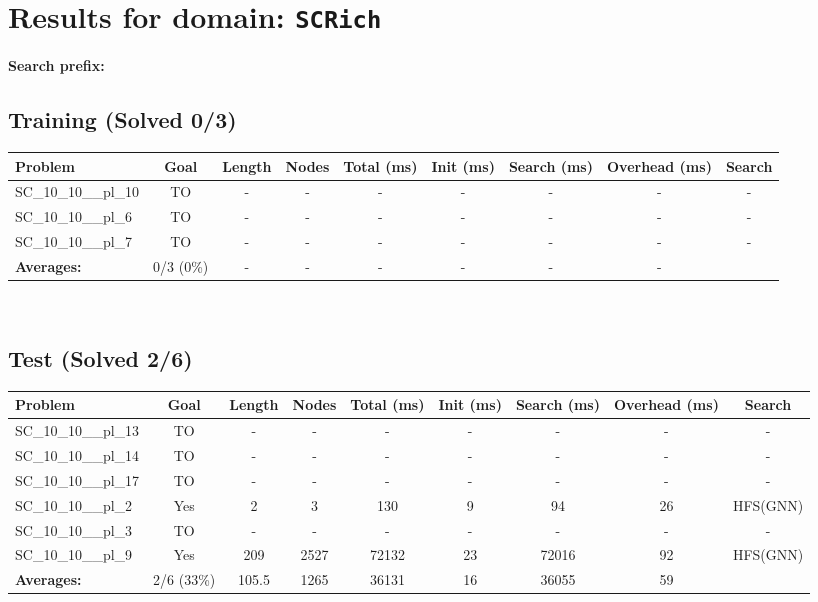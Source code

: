 \documentclass{article}
\begin{document}
\section*{Results for domain: \texttt{SCRich}}
\textbf{Search prefix:} 
\\[0.5cm]
\subsection*{Training (Solved 0/3)}
\begin{tabular}{lcccccccc}
\toprule
Problem & Goal & Length & Nodes & Total (ms) & Init (ms) & Search (ms) & Overhead (ms) & Search \\
\midrule
SC\_10\_10\_\_pl\_10 & TO & - & - & - & - & - & - & - \\
SC\_10\_10\_\_pl\_6 & TO & - & - & - & - & - & - & - \\
SC\_10\_10\_\_pl\_7 & TO & - & - & - & - & - & - & - \\
\textbf{Averages:} & 0/3 (0\%) & - & - & - & - & - & - & \\
\bottomrule
\end{tabular}
\\[0.7cm]
\subsection*{Test (Solved 2/6)}
\begin{tabular}{lcccccccc}
\toprule
Problem & Goal & Length & Nodes & Total (ms) & Init (ms) & Search (ms) & Overhead (ms) & Search \\
\midrule
SC\_10\_10\_\_pl\_13 & TO & - & - & - & - & - & - & - \\
SC\_10\_10\_\_pl\_14 & TO & - & - & - & - & - & - & - \\
SC\_10\_10\_\_pl\_17 & TO & - & - & - & - & - & - & - \\
SC\_10\_10\_\_pl\_2 & Yes & 2 & 3 & 130 & 9 & 94 & 26 & HFS(GNN) \\
SC\_10\_10\_\_pl\_3 & TO & - & - & - & - & - & - & - \\
SC\_10\_10\_\_pl\_9 & Yes & 209 & 2527 & 72132 & 23 & 72016 & 92 & HFS(GNN) \\
\textbf{Averages:} & 2/6 (33\%) & 105.5 & 1265 & 36131 & 16 & 36055 & 59 & \\
\bottomrule
\end{tabular}
\\[0.7cm]
\end{document}
